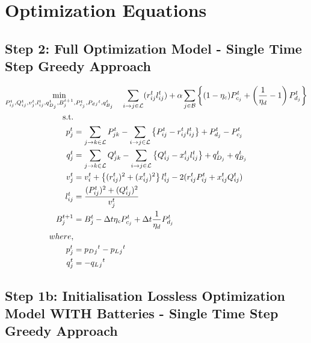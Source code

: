 \section*{Optimization Equations}

\subsection*{Step 2: Full Optimization Model - Single Time Step Greedy Approach}


\begin{gather}
    \min_{P_{ij}^t, Q_{ij}^t, v_{j}^t, l_{ij}^t, q_{D_j}^t, B_{j}^{t+1},
	P_{c_j}^t, P_d{_j}^t, q_{B_j}^t} \quad
	\sum_{\fromto{i, j} \in \mathcal{L}} (r_{ij}^tl_{ij}^t) + 
	\alpha \sum_{j \in \mathcal{B}} \left\{ (1- \eta_c)P_{c_j}^t + \left(\frac{1}{\eta_d}-1\right) P_{d_j}^t \right\} \\
	\begin{align}
		\text{s.t.} & {}\nonumber \\
		{p_j^t} & = {\sum_{\fromto{j,k} \in \mathcal{L}} P_{jk}^t - \sum_{\fromto{i,j} \in \mathcal{L}}\left\{P_{ij}^t - r_{ij}^tl_{ij}^t\right\} + P_{d_j}^t - P_{c_j}^t} && \\
		{q_j^t} & = {\sum_{\fromto{j,k} \in \mathcal{L}} Q_{jk}^t - \sum_{\fromto{i,j} \in \mathcal{L}}\left\{Q_{ij}^t - x_{ij}^tl_{ij}^t\right\} + q_{D_j}^t + q_{B_j}^t} && \\
		{v_j^t} & = {v_{i}^t +  \left\{(r_{ij}^{t})^2 + (x_{ij}^{t})^2\right\}l_{ij}^t - 2(r_{ij}^tP_{ij}^t + x_{ij}^tQ_{ij}^t)} && \\
		{l_{ij}^t} & = {\frac{(P_{ij}^{t})^2 + (Q_{ij}^{t})^2}{v_j^t}} \\
		{B_{j}^{t+1}} &= {B_{j}^{t} - \Delta t  \eta_c P_{c_j}^t + \Delta t\frac{1}{\eta_d} P_{d_j}^t} \\
		{where,} & {} \\
		{p_j^t} &= {p_D{_j}^t - p_L{_j}^t} \\
		{q_j^t} &= {-q_L{_j}^t}
	\end{align}
\end{gather}

\subsection*{Step 1b: Initialisation Lossless Optimization Model WITH Batteries - Single Time Step Greedy Approach}


